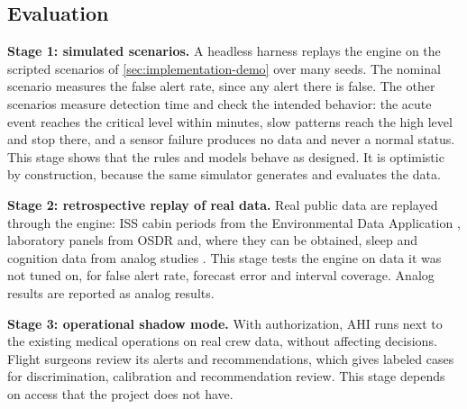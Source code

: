 \subsection{Evaluation}
\label{subsec:evaluation}

\medskip\noindent\textbf{Stage 1: simulated scenarios.} A headless harness replays the engine on the scripted scenarios of \ref{sec:implementation-demo} over many seeds. The nominal scenario measures the false alert rate, since any alert there is false. The other scenarios measure detection time and check the intended behavior: the acute event reaches the critical level within minutes, slow patterns reach the high level and stop there, and a sensor failure produces no data and never a normal status. This stage shows that the rules and models behave as designed. It is optimistic by construction, because the same simulator generates and evaluates the data.

\medskip\noindent\textbf{Stage 2: retrospective replay of real data.} Real public data are replayed through the engine: ISS cabin periods from the Environmental Data Application \cite{osdr_eda}, laboratory panels from OSDR \cite{osdr_osd569,osdr_osd575} and, where they can be obtained, sleep and cognition data from analog studies \cite{nasa_nlsp,nasa_lsda}. This stage tests the engine on data it was not tuned on, for false alert rate, forecast error and interval coverage. Analog results are reported as analog results.

\medskip\noindent\textbf{Stage 3: operational shadow mode.} With authorization, AHI runs next to the existing medical operations on real crew data, without affecting decisions. Flight surgeons review its alerts and recommendations, which gives labeled cases for discrimination, calibration and recommendation review. This stage depends on access that the project does not have.

